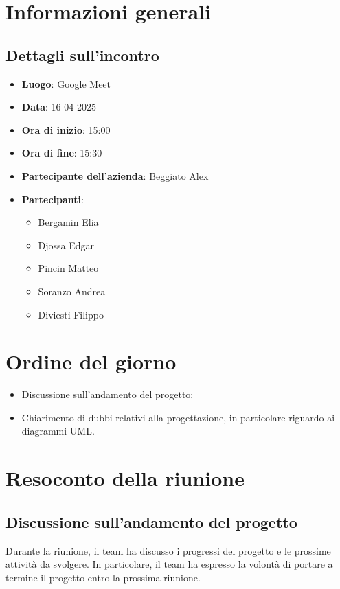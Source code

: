 \section{Informazioni generali}
\subsection{Dettagli sull'incontro}
\begin{itemize}
    \item \textbf{Luogo}: Google Meet
    \item \textbf{Data}: 16-04-2025
    \item \textbf{Ora di inizio}: 15:00
    \item \textbf{Ora di fine}: 15:30
    \item \textbf{Partecipante dell'azienda}: Beggiato Alex
    \item \textbf{Partecipanti}:
    \begin{itemize}
        \item Bergamin Elia
        \item Djossa Edgar
        \item Pincin Matteo 
        \item Soranzo Andrea  
        \item Diviesti Filippo
    \end{itemize}
\end{itemize}

\section{Ordine del giorno}
\begin{itemize}
\item Discussione sull'andamento del progetto;
\item Chiarimento di dubbi relativi alla progettazione, in particolare riguardo ai diagrammi UML.
\end{itemize}

\section{Resoconto della riunione}
\subsection{Discussione sull'andamento del progetto}
Durante la riunione, il team ha discusso i progressi del progetto e le prossime attività da svolgere. In particolare, il team ha espresso la volontà di portare a termine il progetto entro la prossima riunione.

